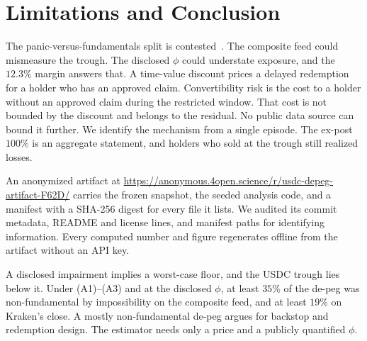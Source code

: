 \section{Limitations and Conclusion}
\label{sec:conc}

The panic-versus-fundamentals split is contested~\cite{anadu2024,watsky2024}. The
composite feed could mismeasure the trough. The disclosed $\phi$ could understate
exposure, and the $12.3\%$ margin answers that. A time-value discount prices a delayed
redemption for a holder who has an approved claim. Convertibility risk is the cost to a
holder without an approved claim during the restricted window. That cost is not bounded
by the discount and belongs to the residual. No public data source can bound it further. We identify the mechanism from a
single episode. The ex-post $100\%$ is an aggregate statement, and holders who sold
at the trough still realized losses.

An anonymized artifact at
\url{https://anonymous.4open.science/r/usdc-depeg-artifact-F62D/} carries the frozen
snapshot, the seeded analysis code, and a manifest with a SHA-256 digest for every file it
lists. We audited its commit metadata, README and license lines, and manifest paths for
identifying information. Every computed number and figure regenerates offline from the
artifact without an API key.

A disclosed impairment implies a worst-case floor, and the USDC trough lies below it.
Under (A1)--(A3) and at the disclosed $\phi$, at least $35\%$ of the de-peg was non-fundamental by impossibility on the composite feed, and at least $19\%$ on Kraken's
close. A mostly non-fundamental de-peg
argues for backstop and redemption design. The estimator needs only a price and a publicly
quantified $\phi$.
